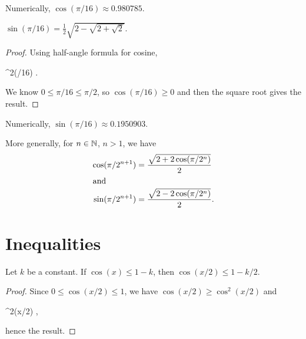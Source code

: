 \begin{remark}
Numerically, $\cos(\pi/16)\approx0.980785$.
\end{remark}

\begin{proposition}
$\displaystyle{\sin(\pi/16) = \frac{1}{2}\sqrt{2 - \sqrt{2 + \sqrt{2}}}}$.
\end{proposition}

\begin{proof}
Using half-angle formula for cosine,
\begin{calculation}
  \sin^{2}(\pi/16)
  .
\end{calculation}
We know $0\leq\pi/16\leq\pi/2$, so $\cos(\pi/16)\geq 0$ and then the
square root gives the result.
\end{proof}

\begin{remark}
Numerically, $\sin(\pi/16)\approx0.1950903$.
\end{remark}

\M
More generally, for $n\in\mathbb{N}$, $n>1$, we have
\begin{subequations}
\begin{align}
\cos(\pi/2^{n+1}) &= \frac{\sqrt{2 + 2\cos(\pi/2^{n})}}{2}\\
\intertext{and}
\sin(\pi/2^{n+1}) &= \frac{\sqrt{2 - 2\cos(\pi/2^{n})}}{2}.
\end{align}
\end{subequations}

\section{Inequalities}

\begin{proposition}
Let $k$ be a constant. If $\cos(x)\leq 1 - k$, then $\cos(x/2)\leq 1 - k/2$.
\end{proposition}

\begin{proof}
Since $0\leq \cos(x/2)\leq 1$, we have $\cos(x/2)\geq\cos^{2}(x/2)$ and
\begin{calculation}
\cos^{2}(x/2)
,
\end{calculation}
hence the result.
\end{proof}

